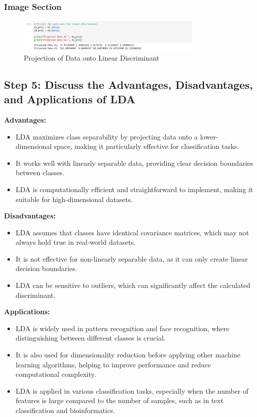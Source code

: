 \documentclass{exam}
\begin{document}
\subsubsection*{Image Section}

\begin{figure}[h!]
    \centering
    \includegraphics[width=0.8\textwidth]{images/lda_projection.png}
    \caption{Projection of Data onto Linear Discriminant}
    \label{fig:lda_projection}
\end{figure}

\newpage

\subsection{Step 5: Discuss the Advantages, Disadvantages, and Applications of LDA}

\textbf{Advantages:}
\begin{itemize}
    \item LDA maximizes class separability by projecting data onto a lower-dimensional space, making it particularly effective for classification tasks.
    \item It works well with linearly separable data, providing clear decision boundaries between classes.
    \item LDA is computationally efficient and straightforward to implement, making it suitable for high-dimensional datasets.
\end{itemize}

\textbf{Disadvantages:}
\begin{itemize}
    \item LDA assumes that classes have identical covariance matrices, which may not always hold true in real-world datasets.
    \item It is not effective for non-linearly separable data, as it can only create linear decision boundaries.
    \item LDA can be sensitive to outliers, which can significantly affect the calculated discriminant.
\end{itemize}

\textbf{Applications:}
\begin{itemize}
    \item LDA is widely used in pattern recognition and face recognition, where distinguishing between different classes is crucial.
    \item It is also used for dimensionality reduction before applying other machine learning algorithms, helping to improve performance and reduce computational complexity.
    \item LDA is applied in various classification tasks, especially when the number of features is large compared to the number of samples, such as in text classification and bioinformatics.
\end{itemize}
\end{document}
